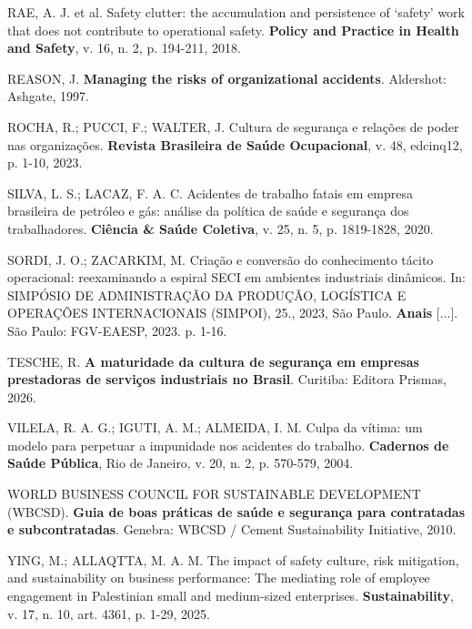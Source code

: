\documentclass[12pt,a4paper]{article}
\begin{document}
\vspace{0.25cm}
\noindent RAE, A. J. et al. Safety clutter: the accumulation and persistence of `safety' work that does not contribute to operational safety. \textbf{Policy and Practice in Health and Safety}, v. 16, n. 2, p. 194-211, 2018.

\vspace{0.25cm}
\noindent REASON, J. \textbf{Managing the risks of organizational accidents}. Aldershot: Ashgate, 1997.

\vspace{0.25cm}
\noindent ROCHA, R.; PUCCI, F.; WALTER, J. Cultura de segurança e relações de poder nas organizações. \textbf{Revista Brasileira de Saúde Ocupacional}, v. 48, edcinq12, p. 1-10, 2023.

\vspace{0.25cm}
\noindent SILVA, L. S.; LACAZ, F. A. C. Acidentes de trabalho fatais em empresa brasileira de petróleo e gás: análise da política de saúde e segurança dos trabalhadores. \textbf{Ciência \& Saúde Coletiva}, v. 25, n. 5, p. 1819-1828, 2020.

\vspace{0.25cm}
\noindent SORDI, J. O.; ZACARKIM, M. Criação e conversão do conhecimento tácito operacional: reexaminando a espiral SECI em ambientes industriais dinâmicos. In: SIMPÓSIO DE ADMINISTRAÇÃO DA PRODUÇÃO, LOGÍSTICA E OPERAÇÕES INTERNACIONAIS (SIMPOI), 25., 2023, São Paulo. \textbf{Anais} [...]. São Paulo: FGV-EAESP, 2023. p. 1-16.

\vspace{0.25cm}
\noindent TESCHE, R. \textbf{A maturidade da cultura de segurança em empresas prestadoras de serviços industriais no Brasil}. Curitiba: Editora Prismas, 2026.

\vspace{0.25cm}
\noindent VILELA, R. A. G.; IGUTI, A. M.; ALMEIDA, I. M. Culpa da vítima: um modelo para perpetuar a impunidade nos acidentes do trabalho. \textbf{Cadernos de Saúde Pública}, Rio de Janeiro, v. 20, n. 2, p. 570-579, 2004.

\vspace{0.25cm}
\noindent WORLD BUSINESS COUNCIL FOR SUSTAINABLE DEVELOPMENT (WBCSD). \textbf{Guia de boas práticas de saúde e segurança para contratadas e subcontratadas}. Genebra: WBCSD / Cement Sustainability Initiative, 2010.

\vspace{0.25cm}
\noindent YING, M.; ALLAQTTA, M. A. M. The impact of safety culture, risk mitigation, and sustainability on business performance: The mediating role of employee engagement in Palestinian small and medium-sized enterprises. \textbf{Sustainability}, v. 17, n. 10, art. 4361, p. 1-29, 2025.
\end{document}
